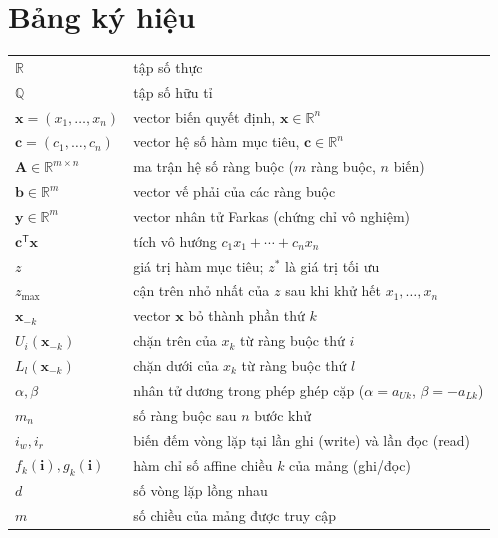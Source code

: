 \documentclass[12pt,a4paper]{article}
\theoremstyle{definition}
\newcommand{\R}{\mathbb{R}}
\newcommand{\Q}{\mathbb{Q}}
\newcommand{\vx}{\mathbf{x}}
\newcommand{\vc}{\mathbf{c}}
\newcommand{\vb}{\mathbf{b}}
\newcommand{\vy}{\mathbf{y}}
\newcommand{\mA}{\mathbf{A}}
\newcommand{\T}{^{\mathsf T}}
\begin{document}
\newpage
\pagestyle{fancy}
\fancyfoot[R]{}
\tableofcontents

\newpage
{}
\setcounter{page}{1}

\section*{Bảng ký hiệu}

\begin{tabular}{ll}
$\R$ & tập số thực \\
$\Q$ & tập số hữu tỉ \\
$\vx = (x_1,\ldots,x_n)$ & vector biến quyết định, $\vx \in \R^n$ \\
$\vc = (c_1,\ldots,c_n)$ & vector hệ số hàm mục tiêu, $\vc \in \R^n$ \\
$\mA \in \R^{m \times n}$ & ma trận hệ số ràng buộc ($m$ ràng buộc, $n$ biến) \\
$\vb \in \R^m$ & vector vế phải của các ràng buộc \\
$\vy \in \R^m$ & vector nhân tử Farkas (chứng chỉ vô nghiệm) \\
$\vc\T\vx$ & tích vô hướng $c_1 x_1 + \cdots + c_n x_n$ \\
$z$ & giá trị hàm mục tiêu; $z^\ast$ là giá trị tối ưu \\
$z_{\max}$ & cận trên nhỏ nhất của $z$ sau khi khử hết $x_1,\ldots,x_n$ \\
$\vx_{-k}$ & vector $\vx$ bỏ thành phần thứ $k$ \\
$U_i(\vx_{-k})$ & chặn trên của $x_k$ từ ràng buộc thứ $i$ \\
$L_l(\vx_{-k})$ & chặn dưới của $x_k$ từ ràng buộc thứ $l$ \\
$\alpha,\beta$ & nhân tử dương trong phép ghép cặp ($\alpha = a_{Uk}$, $\beta = -a_{Lk}$) \\
$m_n$ & số ràng buộc sau $n$ bước khử \\
$i_w, i_r$ & biến đếm vòng lặp tại lần ghi (write) và lần đọc (read) \\
$f_k(\mathbf{i}), g_k(\mathbf{i})$ & hàm chỉ số affine chiều $k$ của mảng (ghi/đọc) \\
$d$ & số vòng lặp lồng nhau \\
$m$ & số chiều của mảng được truy cập \\
\end{tabular}
\end{document}
